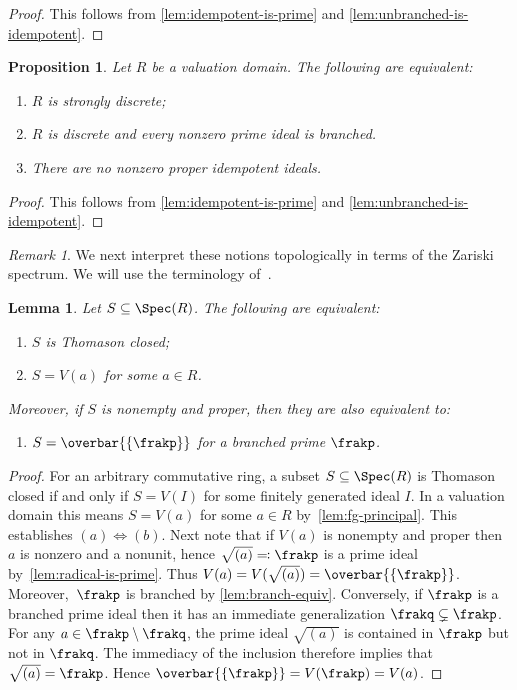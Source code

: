 \documentclass{amsart}
\numberwithin{equation}{section}%
\newtheorem{Prop}[equation]{Proposition}
\newtheorem{Lem}[equation]{Lemma}
\theoremstyle{remark}
\newtheorem{Rem}[equation]{Remark}
\newcounter{enum-resume-hack}
\begin{document}
\begin{proof}
	This follows from \cref{lem:idempotent-is-prime} and \cref{lem:unbranched-is-idempotent}.
\end{proof}

\begin{Prop}\label{prop:strongly-discrete-chars}
	Let $R$ be a valuation domain. The following are equivalent:
	\begin{enumerate}
		\item $R$ is strongly discrete;
		\item $R$ is discrete and every nonzero prime ideal is branched.
		\item There are no nonzero proper idempotent ideals.
	\end{enumerate} 
\end{Prop}

\begin{proof}
	This follows from \cref{lem:idempotent-is-prime} and \cref{lem:unbranched-is-idempotent}.
\end{proof}

\begin{Rem}
	We next interpret these notions topologically in terms of the Zariski spectrum. We will use the terminology of~\cite[Section~2]{BarthelHeardSanders23a}.
\end{Rem}

\begin{Lem}\label{lem:thomason-closed}
	Let $S \subseteq \Spec(R)$. The following are equivalent:
	\begin{enumerate}
		\item $S$ is Thomason closed;
		\item $S = V(a)$ for some $a \in R$.
	\end{enumerate}
	Moreover, if $S$ is nonempty and proper, then they are also equivalent to:
	\begin{enumerate}[resume]
		\item $S=\overbar{\{\frakp\}}$ for a branched prime $\frakp$.
	\end{enumerate}
\end{Lem}

\begin{proof}
	For an arbitrary commutative ring, a subset $S\subseteq \Spec(R)$ is Thomason closed if and only if $S=V(I)$ for some finitely generated ideal $I$. In a valuation domain this means $S=V(a)$ for some $a\in R$ by~\cref{lem:fg-principal}. This establishes $(a) \Leftrightarrow (b)$. Next note that if $V(a)$ is nonempty and proper then $a$ is nonzero and a nonunit, hence $\sqrt{(a)} \eqqcolon \frakp$ is a prime ideal by~\cref{lem:radical-is-prime}. Thus $V(a) = V(\sqrt{(a)})=\overbar{\{\frakp\}}$. Moreover,~$\frakp$ is branched by \cref{lem:branch-equiv}. Conversely, if $\frakp$ is a branched prime ideal then it has an immediate generalization $\frakq\subsetneq\frakp$. For any $a \in \frakp \setminus \frakq$, the prime ideal $\sqrt{(a)}$ is contained in $\frakp$ but not in $\frakq$. The immediacy of the inclusion therefore implies that $\sqrt{(a)} = \frakp$. Hence $\overbar{\{\frakp\}} = V(\frakp)=V(a)$.
\end{proof}
\end{document}
